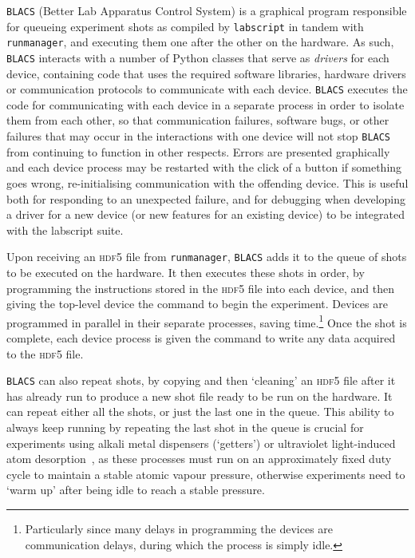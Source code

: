 \texttt{BLACS} (Better Lab Apparatus Control System) is a graphical program responsible for queueing experiment shots as compiled by \texttt{labscript} in tandem with \texttt{runmanager}, and executing them one after the other on the hardware. As such, \texttt{BLACS} interacts with a number of Python classes that serve as \emph{drivers} for each device, containing code that uses the required software libraries, hardware drivers or communication protocols to communicate with each device. \texttt{BLACS} executes the code for communicating with each device in a separate process in order to isolate them from each other, so that communication failures, software bugs, or other failures that may occur in the interactions with one device will not stop \texttt{BLACS} from continuing to function in other respects. Errors are presented graphically and each device process may be restarted with the click of a button if something goes wrong, re-initialising communication with the offending device. This is useful both for responding to an unexpected failure, and for debugging when developing a driver for a new device (or new features for an existing device) to be integrated with the labscript suite.

Upon receiving an \textsc{hdf5} file from \texttt{runmanager}, \texttt{BLACS} adds it to the queue of shots to be executed on the hardware. It then executes these shots in order, by programming the instructions stored in the \textsc{hdf5} file into each device, and then giving the top-level device the command to begin the experiment. Devices are programmed in parallel in their separate processes, saving time.\footnote{Particularly since many delays in programming the devices are communication delays, during which the process is simply idle.} Once the shot is complete, each device process is given the command to write any data acquired to the \textsc{hdf5} file.

\texttt{BLACS} can also repeat shots, by copying and then `cleaning' an \textsc{hdf5} file after it has already run to produce a new shot file ready to be run on the hardware. It can repeat either all the shots, or just the last one in the queue. This ability to always keep running by repeating the last shot in the queue is crucial for experiments using alkali metal dispensers (`getters') or ultraviolet light-induced atom desorption~\cite{klempt_ultraviolet_2006}, as these processes must run on an approximately fixed duty cycle to maintain a stable atomic vapour pressure, otherwise experiments need to `warm up' after being idle to reach a stable pressure.

